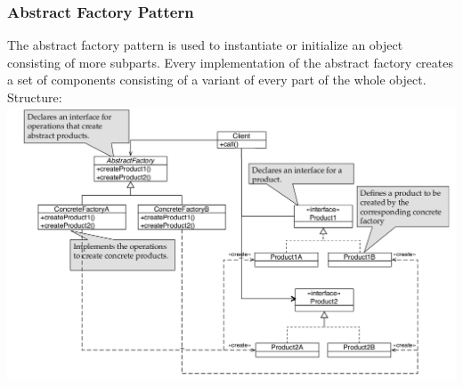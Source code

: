 \subsubsection{Abstract Factory Pattern}
The abstract factory pattern is used to instantiate or initialize an object consisting of more subparts.
Every implementation of the abstract factory creates a set of components consisting of a variant of every part of the whole object.
Structure:\\
\includegraphics[width=\linewidth]{images/pattern_abstract_factory.png}
\newpage
